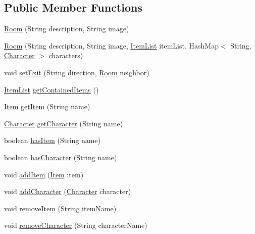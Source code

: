 \subsection*{Public Member Functions}
\begin{DoxyCompactItemize}
\item 
\hyperlink{classpkg__world_1_1Room_ae48ca6830c8c9368ab1cb7e9b006d157}{Room} (String description, String image)
\item 
\hyperlink{classpkg__world_1_1Room_abd6108f1f6d320be8d4fc1418f09d2eb}{Room} (String description, String image, \hyperlink{classpkg__world_1_1pkg__items_1_1ItemList}{Item\-List} item\-List, Hash\-Map$<$ String, \hyperlink{classpkg__world_1_1pkg__characters_1_1Character}{Character} $>$ characters)
\item 
void \hyperlink{classpkg__world_1_1Room_a4a97591f3b574b3d0086843a919a0214}{set\-Exit} (String direction, \hyperlink{classpkg__world_1_1Room}{Room} neighbor)
\item 
\hyperlink{classpkg__world_1_1pkg__items_1_1ItemList}{Item\-List} \hyperlink{classpkg__world_1_1Room_a969205a4d2d2d9e30d1e1db9fc3f0b43}{get\-Contained\-Items} ()
\item 
\hyperlink{classpkg__world_1_1pkg__items_1_1Item}{Item} \hyperlink{classpkg__world_1_1Room_a8624c98bd006830d4484dae2dcd8c8e7}{get\-Item} (String name)
\item 
\hyperlink{classpkg__world_1_1pkg__characters_1_1Character}{Character} \hyperlink{classpkg__world_1_1Room_afe89d01c098acd297e91d313cb65aff1}{get\-Character} (String name)
\item 
boolean \hyperlink{classpkg__world_1_1Room_aefa26e1bc5088dd199dde2e9d471c490}{has\-Item} (String name)
\item 
boolean \hyperlink{classpkg__world_1_1Room_a96612764dfeea7855090e586f02da188}{has\-Character} (String name)
\item 
void \hyperlink{classpkg__world_1_1Room_a118585101b274edfdd43b724382de89c}{add\-Item} (\hyperlink{classpkg__world_1_1pkg__items_1_1Item}{Item} item)
\item 
void \hyperlink{classpkg__world_1_1Room_a8446601b93b79b1e0ab0c8be500f40b1}{add\-Character} (\hyperlink{classpkg__world_1_1pkg__characters_1_1Character}{Character} character)
\item 
void \hyperlink{classpkg__world_1_1Room_ab84c99b33e69d4a3e0700cab4b9efeaa}{remove\-Item} (String item\-Name)
\item 
void \hyperlink{classpkg__world_1_1Room_adca74901eed0132c7bb9ba15b993ac0b}{remove\-Character} (String character\-Name)

\end{DoxyCompactItemize}

